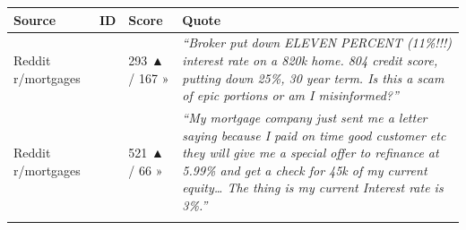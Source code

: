 \documentclass[
  10pt,
]{article}
\let\origtexttt\texttt
\renewcommand{\texttt}[1]{\origtexttt{\seqsplit{#1}}}
\begin{document}
\begin{longtable}[]{@{}llll@{}}
\toprule
\begin{minipage}[b]{0.20\columnwidth}\raggedright
Source\strut
\end{minipage} & \begin{minipage}[b]{0.14\columnwidth}\raggedright
ID\strut
\end{minipage} & \begin{minipage}[b]{0.10\columnwidth}\raggedright
Score\strut
\end{minipage} & \begin{minipage}[b]{0.44\columnwidth}\raggedright
Quote\strut
\end{minipage}\tabularnewline
\midrule
\endhead
\begin{minipage}[t]{0.20\columnwidth}\raggedright
Reddit r/mortgages\strut
\end{minipage} & \begin{minipage}[t]{0.14\columnwidth}\raggedright
\texttt{1p5pyzt}\strut
\end{minipage} & \begin{minipage}[t]{0.10\columnwidth}\raggedright
293 ▲ / 167 »\strut
\end{minipage} & \begin{minipage}[t]{0.44\columnwidth}\raggedright
\emph{``Broker put down ELEVEN PERCENT (11\%!!!) interest rate on a 820k home. 804 credit score,
putting down 25\%, 30 year term. Is this a scam of epic portions or am I misinformed?''}\strut
\end{minipage}\tabularnewline
\begin{minipage}[t]{0.20\columnwidth}\raggedright
Reddit r/mortgages\strut
\end{minipage} & \begin{minipage}[t]{0.14\columnwidth}\raggedright
\texttt{1qw5veu}\strut
\end{minipage} & \begin{minipage}[t]{0.10\columnwidth}\raggedright
521 ▲ / 66 »\strut
\end{minipage} & \begin{minipage}[t]{0.44\columnwidth}\raggedright
\emph{``My mortgage company just sent me a letter saying because I paid on time good customer etc
they will give me a special offer to refinance at 5.99\% and get a check for 45k of my current
equity\ldots{} The thing is my current Interest rate is 3\%.''}\strut
\end{minipage}\tabularnewline
\begin{minipage}[t]{0.20\columnwidth}\raggedright

\end{minipage}
\end{longtable}
\end{document}
